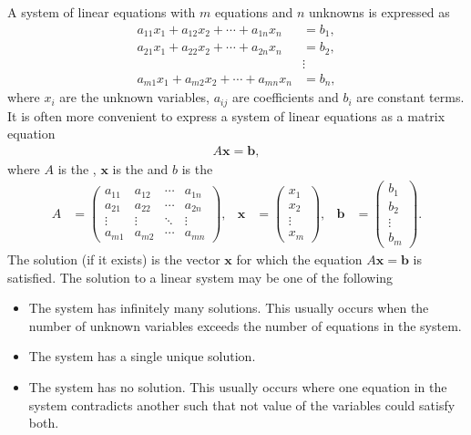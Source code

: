 \documentclass[letterpaper,10pt,english]{jupyterBook}
\begin{document}
\sphinxAtStartPar
A system of linear equations with \(m\) equations and \(n\) unknowns is expressed as
\begin{align*}
    a_{11} x_1 +a_{12} x_2 +\cdots +a_{1n} x_n &=b_1 ,\\
    a_{21} x_1 +a_{22} x_2 +\cdots +a_{2n} x_n &=b_2 ,\\
    &\vdots \\
    a_{m1} x_1 +a_{m2} x_2 +\cdots +a_{mn} x_n &=b_n ,
\end{align*}
\sphinxAtStartPar
where \(x_i\) are the unknown variables, \(a_{ij}\) are coefficients and \(b_i\) are constant terms. It is often more convenient to express a system of linear equations as a matrix equation
\begin{align*}
    A \mathbf{x} = \mathbf{b},
\end{align*}
\sphinxAtStartPar
where \(A\) is the , \(\mathbf{x}\) is the  and \(b\) is the 
\begin{align*}
    A &= \begin{pmatrix}
        a_{11}  & a_{12}  & \cdots  & a_{1n} \\
        a_{21}  & a_{22}  & \cdots  & a_{2n} \\
        \vdots  & \vdots  & \ddots  & \vdots \\
        a_{m1}  & a_{m2}  & \cdots  & a_{mn} 
    \end{pmatrix},& 
    \mathbf{x} &= \begin{pmatrix} x_1 \\ x_2 \\ \vdots \\ x_m \end{pmatrix}, &
    \mathbf{b} &= \begin{pmatrix} b_1 \\ b_2 \\ \vdots \\ b_m \end{pmatrix}.
\end{align*}
\sphinxAtStartPar
The solution (if it exists) is the vector \(\mathbf{x}\) for which the equation \(A\mathbf{x} = \mathbf{b}\) is satisfied. The solution to a linear system may be one of the following
\begin{itemize}
\item {} 
\sphinxAtStartPar
The system has infinitely many solutions. This usually occurs when the number of unknown variables exceeds the number of equations in the system.

\item {} 
\sphinxAtStartPar
The system has a single unique solution.

\item {} 
\sphinxAtStartPar
The system has no solution. This usually occurs where one equation in the system contradicts another such that not value of the variables could satisfy both.

\end{itemize}
\end{document}
